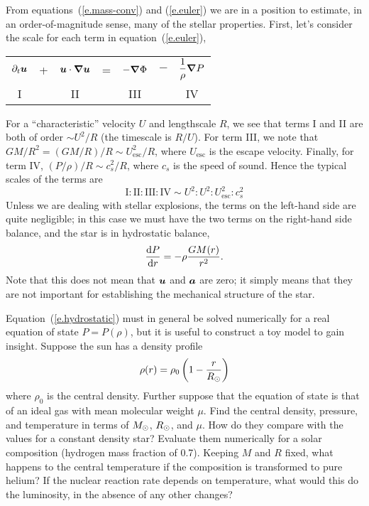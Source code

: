 From equations~(\ref{e.mass-conv}) and (\ref{e.euler}) we are in a position to estimate, in an order-of-magnitude sense, many of the stellar properties.  First, let's consider the scale for each term in equation~(\ref{e.euler}),
\begin{center}\begin{tabular}{ccccccc}
$\displaystyle \partial_{t}\bm{u}$ & + &
$\displaystyle  \bm{u}\cdot\bm{\nabla}\bm{u}$ & = &
$\displaystyle -\bm{\nabla} \Phi $ & $-$ & 
$\displaystyle \frac{1}{\rho}\bm{\nabla} P$\\
I & & II & & III & & IV
\end{tabular}
\end{center}
For a ``characteristic'' velocity $U$ and lengthscale $R$, we see that terms I and II are both of order $\sim U^{2}/R$ (the timescale is $R/U$).  For term III, we note that $GM/R^{2} = (GM/R)/R \sim U_{\mathrm{esc}}^{2}/R$, where $U_{\mathrm{esc}}$ is the escape velocity.  Finally, for term IV, $(P/\rho)/R \sim c_{s}^{2}/R$, where $c_{s}$ is the speed of sound.  Hence the typical scales of the terms are
\[
\textrm{I} : \textrm{II} : \textrm{III} : \textrm{IV} \sim U^{2} : U^{2} : U_{\mathrm{esc}}^{2} : c_{s}^{2}
\]
Unless we are dealing with stellar explosions, the terms on the left-hand side are quite negligible; in this case we must have the two terms on the right-hand side balance, and the star is in hydrostatic balance, 
\begin{equation}\label{e.hydrostatic}
\frac{\mathrm{d} P}{\mathrm{d} r} = -\rho \frac{GM(r)}{r^{2}}.
\end{equation}
Note that this does not mean that $\bm{u}$ and $\bm{a}$ are zero; it simply means that they are not important for establishing the mechanical structure of the star.

\begin{exercisebox}
Equation~(\ref{e.hydrostatic}) must in general be solved numerically for a real equation of state $P = P(\rho)$, but it is useful to construct a toy model to gain insight.  Suppose the sun has a density profile
\[ \rho(r) = \rho_{0}\left(1-\frac{r}{R_{\odot}}\right) \]
where $\rho_{0}$ is the central density. Further suppose that the equation of state is that of an ideal gas with mean molecular weight $\mu$.  Find the central density, pressure, and temperature in terms of $M_\odot$, $R_{\odot}$, and $\mu$. How do they compare with the values for a constant density star?  Evaluate them numerically for a solar composition (hydrogen mass fraction of 0.7).  Keeping $M$ and $R$ fixed, what happens to the central temperature if the composition is transformed to pure helium? If the nuclear reaction rate depends on temperature, what would this do the luminosity, in the absence of any other changes?
\end{exercisebox}

